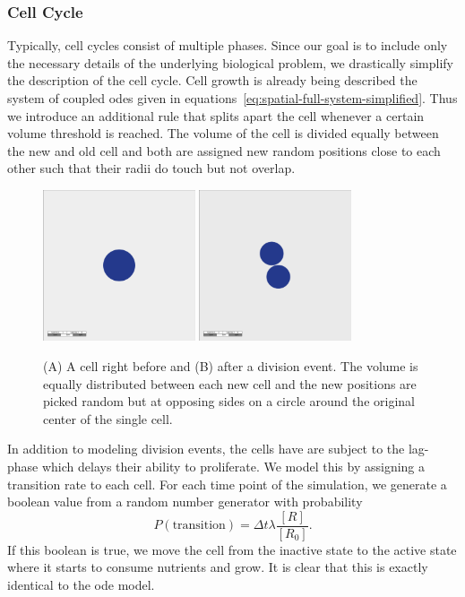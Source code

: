 \documentclass[10pt,A4paper]{article}
\numberwithin{equation}{section}
\begin{document}
\subsubsection{Cell Cycle}
Typically, cell cycles consist of multiple phases.
Since our goal is to include only the necessary details of the underlying biological problem, we drastically simplify the description of the cell cycle.
Cell growth is already being described the system of coupled \acp{ode} given in equations~\eqref{eq:spatial-full-system-simplified}.
Thus we introduce an additional rule that splits apart the cell whenever a certain volume threshold is reached.
The volume of the cell is divided equally between the new and old cell and both are assigned new random positions close to each other such that their radii do touch but not overlap.
\begin{figure}
    \begin{center}
    \includegraphics[width=0.4\textwidth]{Figures/snapshot-2-cells-before-division.png}
    \includegraphics[width=0.4\textwidth]{Figures/snapshot-2-cells-after-division.png}
    \caption{
        (A) A cell right before and (B) after a division event.
        The volume is equally distributed between each new cell and the new positions are picked random but at opposing sides on a circle around the original center of the single cell.
    }
    \end{center}
\end{figure}
In addition to modeling division events, the cells have are subject to the lag-phase which delays their ability to proliferate.
We model this by assigning a transition rate to each cell.
For each time point of the simulation, we generate a boolean value from a random number generator with probability
\begin{equation}
    P(\text{transition}) = \Delta t \lambda \frac{[R]}{[R_0]}.
\end{equation}
If this boolean is true, we move the cell from the inactive state to the active state where it starts to consume nutrients and grow.
It is clear that this is exactly identical to the \ac{ode} model.
%
%
%
\end{document}
